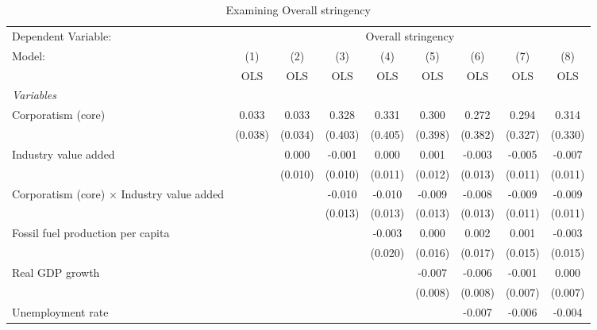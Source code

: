 
\begin{table}[htbp]
   \caption{Examining Overall stringency}
   \centering
   \begin{tabular}{lcccccccc}
      \toprule
      Dependent Variable: & \multicolumn{8}{c}{Overall stringency}\\
      Model:                                            & (1)     & (2)     & (3)     & (4)     & (5)     & (6)     & (7)     & (8)\\  
                                                        &  OLS    & OLS     & OLS     & OLS     & OLS     & OLS     & OLS     & OLS\\  
      \midrule
      \emph{Variables}\\
      Corporatism (core)                                & 0.033   & 0.033   & 0.328   & 0.331   & 0.300   & 0.272   & 0.294   & 0.314\\   
                                                        & (0.038) & (0.034) & (0.403) & (0.405) & (0.398) & (0.382) & (0.327) & (0.330)\\   
      Industry value added                              &         & 0.000   & -0.001  & 0.000   & 0.001   & -0.003  & -0.005  & -0.007\\   
                                                        &         & (0.010) & (0.010) & (0.011) & (0.012) & (0.013) & (0.011) & (0.011)\\   
      Corporatism (core) $\times$ Industry value added  &         &         & -0.010  & -0.010  & -0.009  & -0.008  & -0.009  & -0.009\\   
                                                        &         &         & (0.013) & (0.013) & (0.013) & (0.013) & (0.011) & (0.011)\\   
      Fossil fuel production per capita                 &         &         &         & -0.003  & 0.000   & 0.002   & 0.001   & -0.003\\   
                                                        &         &         &         & (0.020) & (0.016) & (0.017) & (0.015) & (0.015)\\   
      Real GDP growth                                   &         &         &         &         & -0.007  & -0.006  & -0.001  & 0.000\\   
                                                        &         &         &         &         & (0.008) & (0.008) & (0.007) & (0.007)\\   
      Unemployment rate                                 &         &         &         &         &         & -0.007  & -0.006  & -0.004\\   

\end{tabular}
\end{table}
